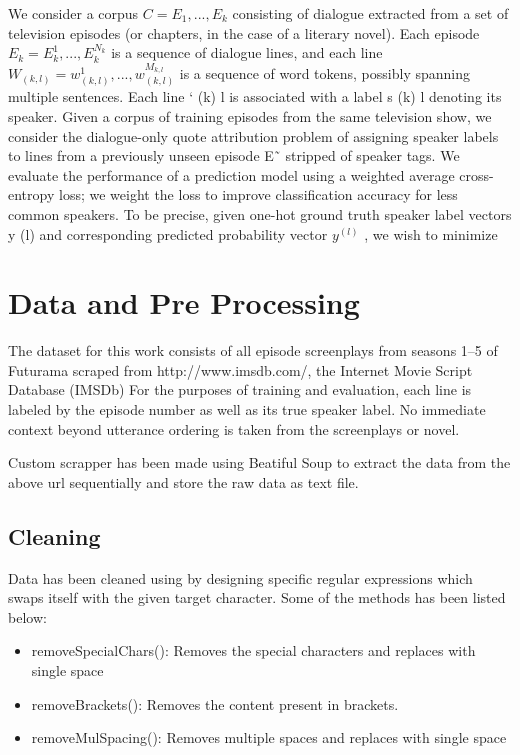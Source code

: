 \documentclass[BTech]{srmuthesis}
\begin{document}
We consider a corpus $C = {E_1, . . . , E_k}$ consisting of dialogue extracted from a set of television episodes (or chapters, in the case of a literary novel). Each episode $E_k = { E_k^1 , . . . , E_k^{N_k} }$ is a sequence of dialogue lines, and each line $W_{(k,l)}  = {w_{(k,l)}^1 , . . . , w_{(k,l)}^{M_{k,l}} }$ is a sequence of word tokens, possibly spanning multiple sentences. Each line ` (k) l is associated with a label s (k) l denoting its speaker. Given a corpus of training episodes from the same television show, we consider the dialogue-only quote attribution problem of assigning speaker labels to lines from a previously unseen episode E˜ stripped of speaker tags. We evaluate the performance of a prediction model using a weighted average cross-entropy loss; we weight the loss to improve classification accuracy for less common speakers. To be precise, given one-hot ground truth speaker label vectors y (l) and corresponding predicted probability vector $y^{(l)}$ , we wish to minimize 

\chapter{Data and Pre Processing}

The dataset for this work consists of all episode screenplays from seasons 1–5 of Futurama scraped from http://www.imsdb.com/, the Internet Movie Script Database (IMSDb) For the purposes of training and evaluation, each line is labeled by the episode number as well as its true speaker label. No immediate context beyond utterance ordering is taken from the screenplays or novel.

Custom scrapper has been made using Beatiful Soup to extract the data from the above url sequentially and store the raw data as text file. 

\section{Cleaning}

Data has been cleaned using by designing specific regular expressions which swaps itself with the given target character. Some of the methods has been listed below:

\begin{itemize}
\item removeSpecialChars(): Removes the special characters and replaces with single space
\item removeBrackets(): Removes the content present in brackets.
\item removeMulSpacing(): Removes multiple spaces and replaces with single space
\end{itemize}
\end{document}
